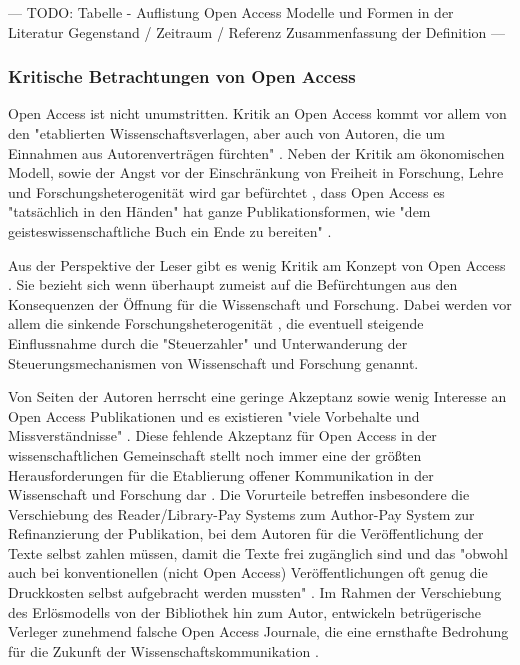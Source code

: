 --- TODO: Tabelle - Auflistung Open Access  Modelle und Formen in der Literatur Gegenstand / Zeitraum / Referenz Zusammenfassung der Definition ---

\subsubsection{Kritische Betrachtungen von Open Access}

Open Access ist nicht unumstritten. Kritik an Open Access kommt vor allem von den "etablierten Wissenschaftsverlagen, aber auch von Autoren, die um Einnahmen aus Autorenverträgen fürchten" \cite{Schirmbacher_oa_2007}. Neben der Kritik am ökonomischen Modell, sowie der Angst vor der Einschränkung von Freiheit in Forschung, Lehre und Forschungsheterogenität wird gar befürchtet \cite{Szczesny_2014}, dass Open Access es "tatsächlich in den Händen" hat ganze Publikationsformen, wie "dem geisteswissenschaftliche Buch ein Ende zu bereiten" \cite{Hirschi_2015_buch_oa}.

Aus der Perspektive der Leser gibt es wenig Kritik am Konzept von Open Access \cite{wein_2010_erwerbung} \cite{weishaupt_2009_goldenOA}. Sie bezieht sich wenn überhaupt zumeist auf die Befürchtungen aus den Konsequenzen der Öffnung für die Wissenschaft und Forschung. Dabei werden vor allem die sinkende Forschungsheterogenität \cite{Hirschi_2015_buch_oa}, die eventuell steigende Einflussnahme durch die "Steuerzahler" und Unterwanderung der Steuerungsmechanismen von Wissenschaft und Forschung genannt.

Von Seiten der Autoren herrscht eine geringe Akzeptanz sowie wenig Interesse an Open Access Publikationen und es existieren "viele Vorbehalte und Missverständnisse" \cite{Suber_2002}. Diese fehlende Akzeptanz für Open Access in der wissenschaftlichen Gemeinschaft stellt noch immer eine der größten Herausforderungen für die Etablierung offener Kommunikation in der Wissenschaft und Forschung dar \cite{weishaupt_2009_goldenOA}. Die Vorurteile betreffen insbesondere die Verschiebung des Reader/Library-Pay Systems zum Author-Pay System \cite{EuropeanCommission_sciencepub_2006} \cite{Chibnik_2015} zur Refinanzierung der Publikation, bei dem Autoren für die Veröffentlichung der Texte selbst zahlen müssen, damit die Texte frei zugänglich sind \cite{Mussell_2013} und das "obwohl auch bei konventionellen (nicht Open Access) Veröffentlichungen oft genug die Druckkosten selbst aufgebracht werden mussten" \cite{weishaupt_2009_goldenOA}. Im Rahmen der Verschiebung des Erlösmodells von der Bibliothek hin zum Autor, entwickeln betrügerische Verleger zunehmend falsche Open Access Journale, die eine ernsthafte Bedrohung für die Zukunft der Wissenschaftskommunikation \cite{Beall_2012}.

